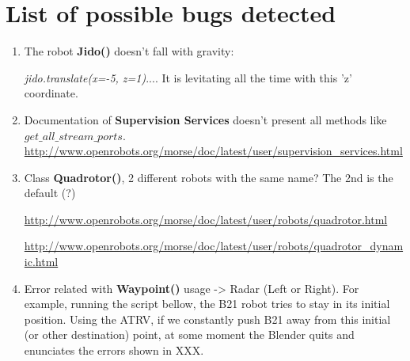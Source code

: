 \chapter*{List of possible bugs detected}

\begin{enumerate}
\item The robot \textbf{Jido()} doesn't fall with gravity:

\textit{jido.translate(x=-5, z=1)}.... It is levitating all the time with this 'z' coordinate.

\item Documentation of \textbf{Supervision Services} doesn't present all methods like \textit{$get\_all\_stream\_ports$}.
\url{http://www.openrobots.org/morse/doc/latest/user/supervision_services.html}

\item Class \textbf{Quadrotor()}, 2 different robots with the same name? The 2nd is the default (?)

\url{http://www.openrobots.org/morse/doc/latest/user/robots/quadrotor.html}

\url{http://www.openrobots.org/morse/doc/latest/user/robots/quadrotor_dynamic.html}

\item Error related with \textbf{Waypoint()} usage -> Radar (Left or Right). For example, running the script bellow, the B21 robot tries to stay in its initial position. Using the ATRV, if we constantly push B21 away from this initial (or other destination) point, at some moment the Blender quits and enunciates the errors shown in XXX.

\end{enumerate}

